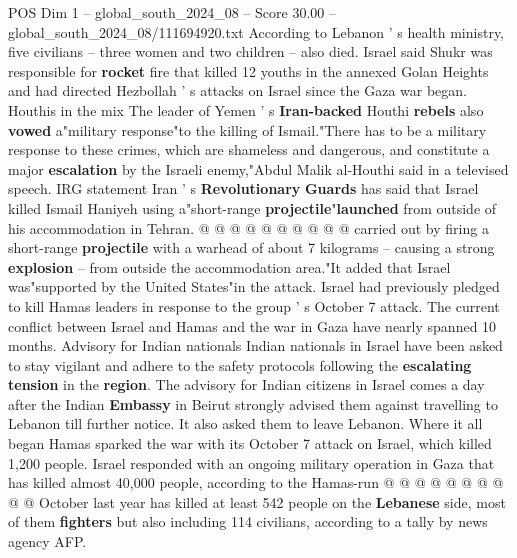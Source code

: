 \begin{textsample}{POS Dim 1 – global\_south\_2024\_08 – Score 30.00 – global\_south\_2024\_08/111694920.txt}
According to Lebanon ' s health ministry, five civilians -- three women and two children -- also died.
Israel said Shukr was responsible for \textbf{rocket} fire that killed 12 youths in the annexed Golan Heights and had directed Hezbollah ' s attacks on Israel since the Gaza war began.
Houthis in the mix The leader of Yemen ' s \textbf{Iran-backed} Houthi \textbf{rebels} also \textbf{vowed} a"military response"to the killing of Ismail."There has to be a military response to these crimes, which are shameless and dangerous, and constitute a major \textbf{escalation} by the Israeli enemy,"Abdul Malik al-Houthi said in a televised speech.
IRG statement Iran ' s \textbf{Revolutionary} \textbf{Guards} has said that Israel killed Ismail Haniyeh using a"short-range \textbf{projectile}"\textbf{launched} from outside of his accommodation in Tehran. @ @ @ @ @ @ @ @ @ @ carried out by firing a short-range \textbf{projectile} with a warhead of about 7 kilograms -- causing a strong \textbf{explosion} -- from outside the accommodation area."It added that Israel was"supported by the United States"in the attack.
Israel had previously pledged to kill Hamas leaders in response to the group ' s October 7 attack.
The current conflict between Israel and Hamas and the war in Gaza have nearly spanned 10 months.
Advisory for Indian nationals Indian nationals in Israel have been asked to stay vigilant and adhere to the safety protocols following the \textbf{escalating} \textbf{tension} in the \textbf{region}.
The advisory for Indian citizens in Israel comes a day after the Indian \textbf{Embassy} in Beirut strongly advised them against travelling to Lebanon till further notice.
It also asked them to leave Lebanon.
Where it all began Hamas sparked the war with its October 7 attack on Israel, which killed 1,200 people.
Israel responded with an ongoing military operation in Gaza that has killed almost 40,000 people, according to the Hamas-run @ @ @ @ @ @ @ @ @ @ October last year has killed at least 542 people on the \textbf{Lebanese} side, most of them \textbf{fighters} but also including 114 civilians, according to a tally by news agency AFP.

\end{textsample}
